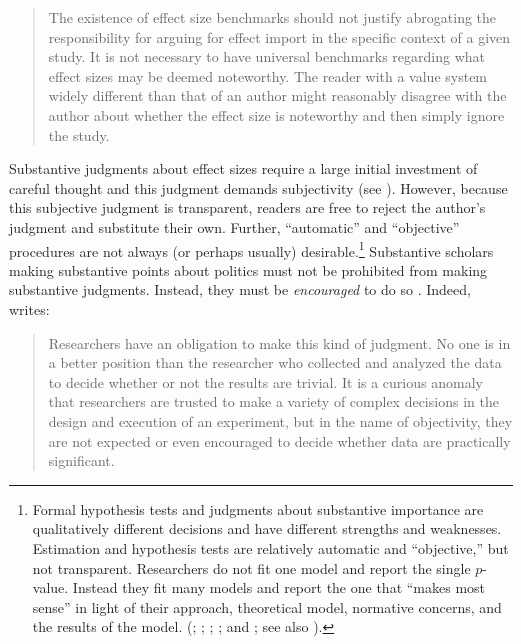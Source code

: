 \documentclass[12pt]{article}
\begin{document}
\begin{quote}
The existence of effect size benchmarks should not justify abrogating the responsibility for arguing for effect import in the specific context of a given study. It is not necessary to have universal benchmarks regarding what effect sizes may be deemed noteworthy. The reader with a value system widely different than that of an author might reasonably disagree with the author about whether the effect size is noteworthy and then simply ignore the study.
\end{quote}

Substantive judgments about effect sizes require a large initial investment of careful thought and this judgment demands subjectivity (see \citealt{Rainey2014}). However, because this subjective judgment is transparent, readers are free to reject the author's judgment and substitute their own. Further, ``automatic'' and ``objective'' procedures are not always (or perhaps usually) desirable.\footnote{Formal hypothesis tests and judgments about substantive importance are qualitatively different decisions and have different strengths and weaknesses. Estimation and hypothesis tests are relatively automatic and ``objective,'' but not transparent. Researchers do not fit one model and report the single $p$-value. Instead they fit many models and report the one that ``makes most sense'' in light of their approach, theoretical model, normative concerns, and the results of the model. (\citealt{GerberMalhotra2008}; \citealt{SimmonsNelsonSimonsohn2011}; \citealt{Francis2013}; \citealt{SimmonsNelsonSimonsohn2014}; and \citealt{EsareyWu2014}; see also \citealt{GelmanLoken2014}).} Substantive scholars making substantive points about politics must not be prohibited from making substantive judgments. Instead, they must be \emph{encouraged} to do so \citep{Achen1982}. Indeed, \citet[p. 755]{Kirk1996} writes:

\begin{quote}
Researchers have an obligation to make this kind of judgment. No one is in a better position than the researcher who collected and analyzed the data to decide whether or not the results are trivial. It is a curious anomaly that researchers are trusted to make a variety of complex decisions in the design and execution of an experiment, but in the name of objectivity, they are not expected or even encouraged to decide whether data are practically significant.
\end{quote}
\end{document}
